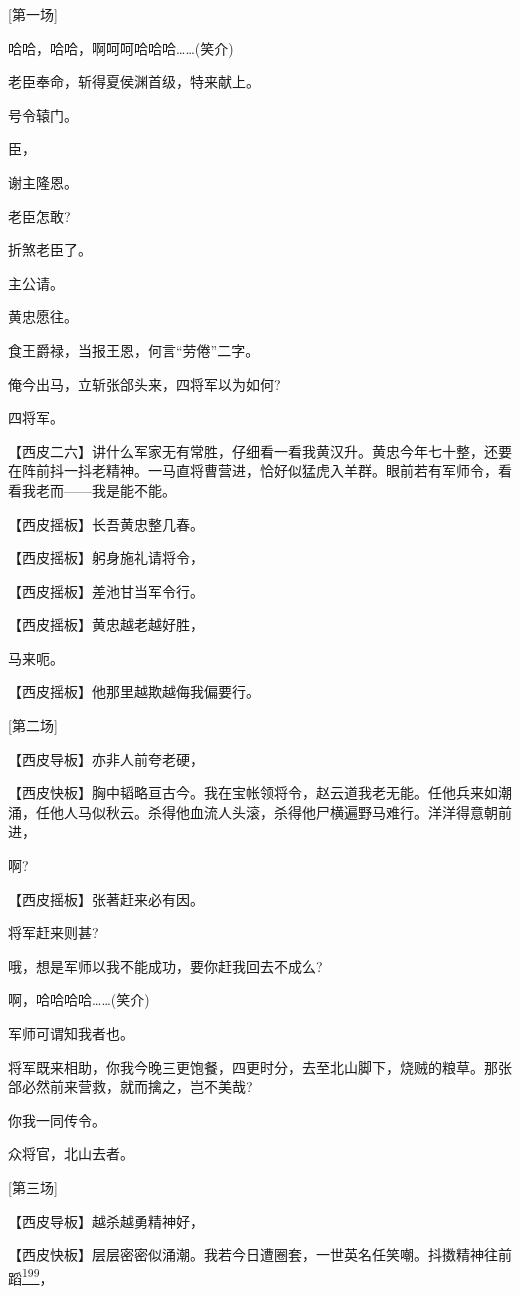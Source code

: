 {[}第一场{]}

哈哈，哈哈，啊呵呵哈哈哈\ldots{}\ldots{}(笑介)

老臣奉命，斩得夏侯渊首级，特来献上。

号令辕门。

臣，

谢主隆恩。

老臣怎敢?

折煞老臣了。

主公请。

黄忠愿往。

食王爵禄，当报王恩，何言``劳倦''二字。

俺今出马，立斩张郃头来，四将军以为如何?

四将军。

【西皮二六】讲什么军家无有常胜，仔细看一看我黄汉升。黄忠今年七十整，还要在阵前抖一抖老精神。一马直将曹营进，恰好似猛虎入羊群。眼前若有军师令，看看我老而------我是能不能。

【西皮摇板】长吾黄忠整几春。

【西皮摇板】躬身施礼请将令，

【西皮摇板】差池甘当军令行。

【西皮摇板】黄忠越老越好胜，

马来呃。

【西皮摇板】他那里越欺越侮我偏要行。

{[}第二场{]}

【西皮导板】亦非人前夸老硬，

【西皮快板】胸中韬略亘古今。我在宝帐领将令，赵云道我老无能。任他兵来如潮涌，任他人马似秋云。杀得他血流人头滚，杀得他尸横遍野马难行。洋洋得意朝前进，

啊?

【西皮摇板】张著赶来必有因。

将军赶来则甚?

哦，想是军师以我不能成功，要你赶我回去不成么?

啊，哈哈哈哈\ldots{}\ldots{}(笑介)

军师可谓知我者也。

将军既来相助，你我今晚三更饱餐，四更时分，去至北山脚下，烧贼的粮草。那张郃必然前来营救，就而擒之，岂不美哉?

你我一同传令。

众将官，北山去者。

{[}第三场{]}

【西皮导板】越杀越勇精神好，

【西皮快板】层层密密似涌潮。我若今日遭圈套，一世英名任笑嘲。抖擞精神往前蹈\protect\hyperlink{fn199}{\textsuperscript{199}}，

